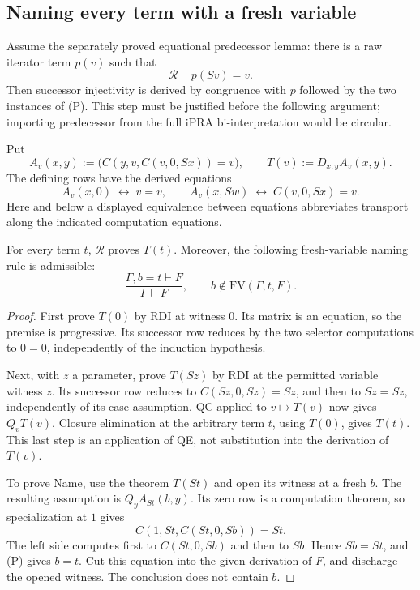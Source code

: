 \subsection{Naming every term with a fresh variable}

Assume the separately proved equational predecessor lemma: there is a
raw iterator term $p(v)$ such that
\[
 \mathcal R\vdash p(Sv)=v.
 \tag{P}
\]
Then successor injectivity is derived by congruence with $p$ followed by
the two instances of (P).  This step must be justified before the
following argument; importing predecessor from the full iPRA
bi-interpretation would be circular.

Put
\[
 A_v(x,y):=\bigl(C(y,v,C(v,0,Sx))=v\bigr),\qquad
 T(v):=D_{x,y}A_v(x,y).
\]
The defining rows have the derived equations
\[
 A_v(x,0)\;\longleftrightarrow\;v=v,
 \qquad
 A_v(x,Sw)\;\longleftrightarrow\;C(v,0,Sx)=v.
\]
Here and below a displayed equivalence between equations abbreviates
transport along the indicated computation equations.

\begin{lemma}
For every term $t$, $\mathcal R$ proves $T(t)$.  Moreover, the following
fresh-variable naming rule is admissible:
\[
 \frac{\Gamma,b=t\vdash F}{\Gamma\vdash F},
 \qquad b\notin\mathrm{FV}(\Gamma,t,F).
 \tag{Name}
\]
\end{lemma}
\begin{proof}
First prove $T(0)$ by RDI at witness $0$.  Its matrix is an equation, so
the premise is progressive.  Its successor row reduces by the two
selector computations to $0=0$, independently of the induction
hypothesis.

Next, with $z$ a parameter, prove $T(Sz)$ by RDI at the permitted
variable witness $z$.  Its successor row reduces to
$C(Sz,0,Sz)=Sz$, and then to $Sz=Sz$, independently of its case
assumption.  QC applied to $v\mapsto T(v)$ now gives $Q_vT(v)$.
Closure elimination at the arbitrary term $t$, using $T(0)$, gives
$T(t)$.  This last step is an application of QE, not substitution into
the derivation of $T(v)$.

To prove Name, use the theorem $T(St)$ and open its witness at a fresh
$b$.  The resulting assumption is $Q_yA_{St}(b,y)$.  Its zero row is
a computation theorem, so specialization at $1$ gives
\[
 C(1,St,C(St,0,Sb))=St.
\]
The left side computes first to $C(St,0,Sb)$ and then to $Sb$.
Hence $Sb=St$, and (P) gives $b=t$.  Cut this equation into the given
derivation of $F$, and discharge the opened witness.  The conclusion
does not contain $b$.
\end{proof}

